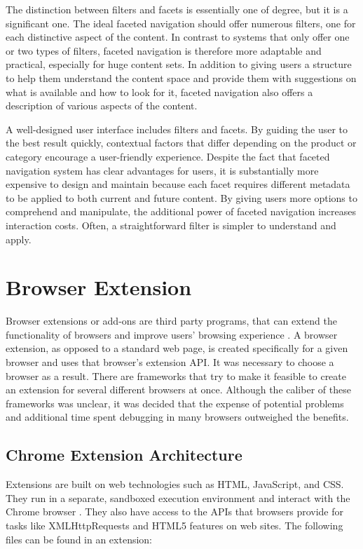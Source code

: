 The distinction between filters and facets is essentially one of degree, but it is a significant one. The ideal faceted navigation should offer numerous filters, one for each distinctive aspect of the content. In contrast to systems that only offer one or two types of filters, faceted navigation is therefore more adaptable and practical, especially for huge content sets. In addition to giving users a structure to help them understand the content space and provide them with suggestions on what is available and how to look for it, faceted navigation also offers a description of various aspects of the content.

A well-designed user interface includes filters and facets. By guiding the user to the best result quickly, contextual factors that differ depending on the product or category encourage a user-friendly experience. Despite the fact that faceted navigation system has clear advantages for users, it is substantially more expensive to design and maintain because each facet requires different metadata to be applied to both current and future content. By giving users more options to comprehend and manipulate, the additional power of faceted navigation increases interaction costs. Often, a straightforward filter is simpler to understand and apply.


\section{Browser Extension}
Browser extensions or add-ons are third party programs, that can extend the functionality of browsers and improve users' browsing experience \autocite{some2019empoweb}. A browser extension, as opposed to a standard web page, is created specifically for a given browser and uses that browser's extension API. It was necessary to choose a browser as a result. There are frameworks that try to make it feasible to create an extension for several different browsers at once. Although the caliber of these frameworks was unclear, it was decided that the expense of potential problems and additional time spent debugging in many browsers outweighed the benefits.

\subsection{Chrome Extension Architecture}
Extensions are built on web technologies such as HTML, JavaScript, and CSS. They run in a separate, sandboxed execution environment and interact with the Chrome browser \autocite{google2021what}. They also have access to the APIs that browsers provide for tasks like XMLHttpRequests and HTML5 features on web sites. The following files can be found in an extension:

